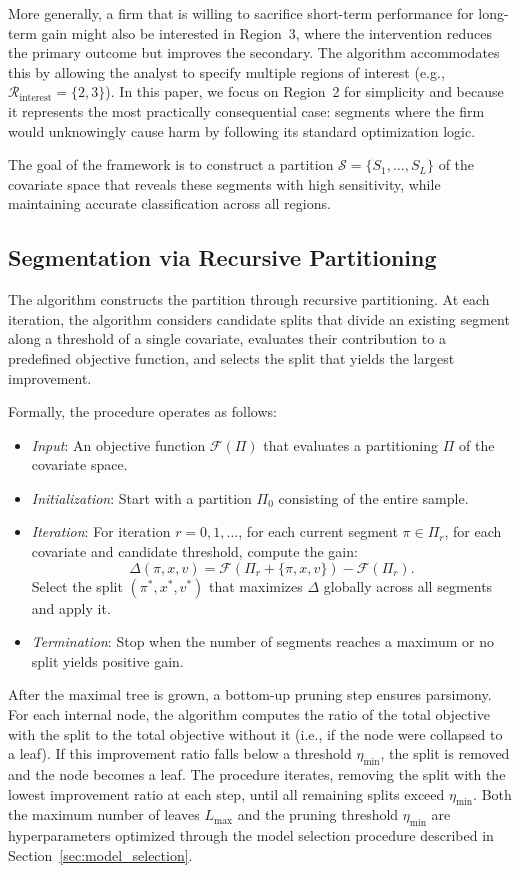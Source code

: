 \documentclass[11pt,letterpaper,english]{article}
\theoremstyle{definition}
\theoremstyle{definition}
\begin{document}
\begin{bibunit}
More generally, a firm that is willing to sacrifice short-term performance for long-term gain might also be interested in Region~3, where the intervention reduces the primary outcome but improves the secondary. The algorithm accommodates this by allowing the analyst to specify multiple regions of interest (e.g., $\mathcal{R}_{\text{interest}} = \{2, 3\}$). In this paper, we focus on Region~2 for simplicity and because it represents the most practically consequential case: segments where the firm would unknowingly cause harm by following its standard optimization logic.

The goal of the framework is to construct a partition $\mathcal{S} = \{S_1, \dots, S_L\}$ of the covariate space that reveals these segments with high sensitivity, while maintaining accurate classification across all regions.

\subsection{Segmentation via Recursive Partitioning}
\label{sec:recur_part}

The algorithm constructs the partition through recursive partitioning. At each iteration, the algorithm considers candidate splits that divide an existing segment along a threshold of a single covariate, evaluates their contribution to a predefined objective function, and selects the split that yields the largest improvement.

Formally, the procedure operates as follows:
\begin{itemize}[leftmargin=2em]
    \item \emph{Input}: An objective function $\mathcal{F}(\Pi)$ that evaluates a partitioning $\Pi$ of the covariate space.
    \item \emph{Initialization}: Start with a partition $\Pi_0$ consisting of the entire sample.
    \item \emph{Iteration}: For iteration $r=0,1,\dots$, for each current segment $\pi \in \Pi_r$, for each covariate and candidate threshold, compute the gain:
    \[
    \Delta(\pi,x,v) = \mathcal{F}(\Pi_r + \{\pi,x,v\}) - \mathcal{F}(\Pi_r).
    \]
    Select the split $(\pi^*,x^*,v^*)$ that maximizes $\Delta$ globally across all segments and apply it.
    \item \emph{Termination}: Stop when the number of segments reaches a maximum or no split yields positive gain.
\end{itemize}

After the maximal tree is grown, a bottom-up pruning step ensures parsimony. For each internal node, the algorithm computes the ratio of the total objective with the split to the total objective without it (i.e., if the node were collapsed to a leaf). If this improvement ratio falls below a threshold $\eta_{\min}$, the split is removed and the node becomes a leaf. The procedure iterates, removing the split with the lowest improvement ratio at each step, until all remaining splits exceed $\eta_{\min}$. Both the maximum number of leaves $L_{\max}$ and the pruning threshold $\eta_{\min}$ are hyperparameters optimized through the model selection procedure described in Section~\ref{sec:model_selection}.


\end{bibunit}
\end{document}
